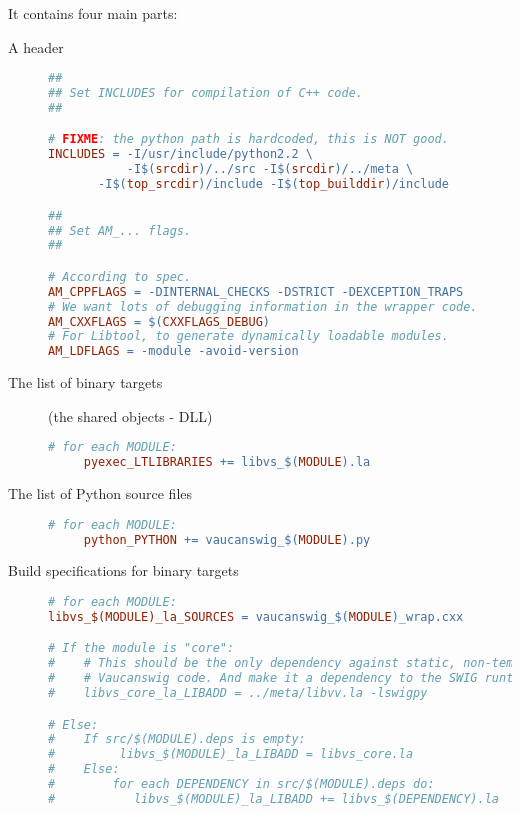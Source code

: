 It contains four main parts:
\begin{description}
\item[A header]
\begin{lstlisting}[language=Makefile]
##
## Set INCLUDES for compilation of C++ code.
##

# FIXME: the python path is hardcoded, this is NOT good.
INCLUDES = -I/usr/include/python2.2 \
           -I$(srcdir)/../src -I$(srcdir)/../meta \
  	   -I$(top_srcdir)/include -I$(top_builddir)/include

##
## Set AM_... flags.
##

# According to spec.
AM_CPPFLAGS = -DINTERNAL_CHECKS -DSTRICT -DEXCEPTION_TRAPS
# We want lots of debugging information in the wrapper code.
AM_CXXFLAGS = $(CXXFLAGS_DEBUG)
# For Libtool, to generate dynamically loadable modules.
AM_LDFLAGS = -module -avoid-version
\end{lstlisting}%

\item[The list of binary targets]
(the shared objects - DLL)

\begin{lstlisting}[language=Makefile]
     # for each MODULE:
     pyexec_LTLIBRARIES += libvs_$(MODULE).la
\end{lstlisting}%

\item[The list of Python source files]

\begin{lstlisting}[language=Makefile]
     # for each MODULE:
     python_PYTHON += vaucanswig_$(MODULE).py
\end{lstlisting}%
   
\item[Build specifications for binary targets]

\begin{lstlisting}[language=Makefile]
# for each MODULE:
libvs_$(MODULE)_la_SOURCES = vaucanswig_$(MODULE)_wrap.cxx

# If the module is "core":
#    # This should be the only dependency against static, non-template
#    # Vaucanswig code. And make it a dependency to the SWIG runtime.
#    libvs_core_la_LIBADD = ../meta/libvv.la -lswigpy

# Else:
#    If src/$(MODULE).deps is empty:
#	      libvs_$(MODULE)_la_LIBADD = libvs_core.la
#    Else:
#        for each DEPENDENCY in src/$(MODULE).deps do:
#	        libvs_$(MODULE)_la_LIBADD += libvs_$(DEPENDENCY).la
\end{lstlisting}%
\end{description}
   
